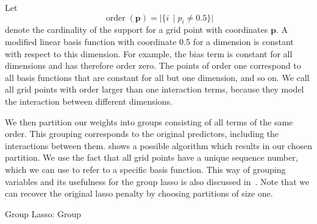Let
\begin{equation*}
  \operatorname{order}(\bm{p}) = \vert \{ i\, \mid p_i \neq 0.5 \} \vert
\end{equation*}
denote the cardinality of the support for a grid point with coordinates \(\bm{p}\).
A modified linear basis function with coordinate 0.5 for a dimension is constant with respect to
this dimension.
For example, the bias term is constant for all dimensions and has therefore
order zero.
The points of order one correspond to all basis functions that are constant for
all but one dimension, and so on.
We call all grid points with order larger than one interaction terms, because
they model the interaction between different dimensions.

We then partition our weights into groups consisting of all terms of the same order.
This grouping corresponds to the original predictors, including the interactions
between them.
 shows a possible algorithm which results in our chosen
partition.
We use the fact that all grid points have a unique sequence number, which we can use to refer to a specific basis function.
This way of grouping variables and its usefulness for the group lasso is also
discussed in~\cite{sparse-parsimony}.
Note that we can recover the original lasso penalty by choosing partitions of size one.

\begin{algorithm}[h]
\caption{Group Lasso: Group}\label{alg:group} 
 \begin{algorithmic}[1]
   \Statex
      \EndFor
        \Else
      \EndIf
    \EndFor
   \State {}
   \EndFunction
 \end{algorithmic}
 \end{algorithm}


